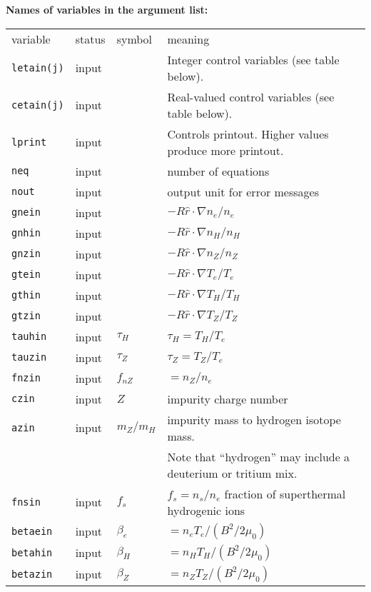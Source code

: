 \begin{center}
{\bf Names of variables in the argument list:}
\begin{tabular}{lllp{3.0in}}
variable & status & symbol & meaning \\
{\tt letain(j)} & input & & Integer control variables
                            (see table below).\\
{\tt cetain(j)} & input & & Real-valued control variables
                            (see table below).\\
{\tt lprint}    & input & & Controls printout. 
 Higher values produce more printout. \\
{\tt neq} & input & & number of equations \\
{\tt nout} & input & & output unit for error messages \\
{\tt gnein} & input & $  $ & $ - R\hat{r} \cdot \nabla n_e / n_e $ \\
{\tt gnhin} & input & $  $ & $ - R\hat{r} \cdot \nabla n_H / n_H $ \\
{\tt gnzin} & input & $  $ & $ - R\hat{r} \cdot \nabla n_Z / n_Z $ \\
{\tt gtein} & input & $  $ & $ - R\hat{r} \cdot \nabla T_e / T_e $ \\
{\tt gthin} & input & $  $ & $ - R\hat{r} \cdot \nabla T_H / T_H $ \\
{\tt gtzin} & input & $  $ & $ - R\hat{r} \cdot \nabla T_Z / T_Z $ \\
{\tt tauhin} & input & $\tau_H$ & $ \tau_H = T_H / T_e $ \\
{\tt tauzin} & input & $\tau_Z$ & $ \tau_Z = T_Z / T_e $ \\
{\tt fnzin} & input & $ f_{nZ} $ & $ = n_Z / n_e $ \\
{\tt czin}  & input & $ Z $ & impurity charge number \\
{\tt azin}  & input & $ m_Z / m_H $
     & impurity mass to hydrogen isotope mass. \\
 & & & Note that ``hydrogen'' may include a deuterium or tritium mix. \\
{\tt fnsin}  & input & $ f_s $
  & $ f_s = n_s / n_e $ fraction of superthermal hydrogenic ions \\
{\tt betaein} & input & $\beta_e$ &
     $ = n_e T_e / ( B^2 / 2 \mu_0 ) $ \\
{\tt betahin} & input & $\beta_H$ &
     $ = n_H T_H / ( B^2 / 2 \mu_0 ) $ \\
{\tt betazin} & input & $\beta_Z$ &
     $ = n_Z T_Z / ( B^2 / 2 \mu_0 ) $ \\

\end{tabular}
\end{center}
